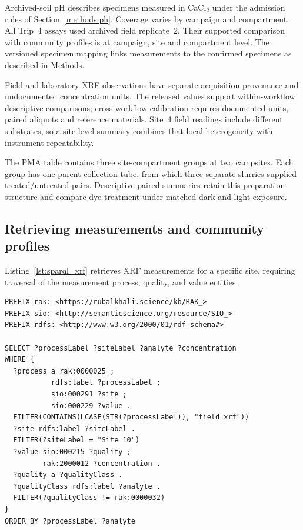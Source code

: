 \begin{revision}
Archived-soil pH describes specimens measured in CaCl$_2$ under the
admission rules of Section~\ref{methods:ph}. Coverage varies by
campaign and compartment. All Trip~4 assays used archived field
replicate~2. Their supported comparison with community profiles is at
campaign, site and compartment level. The versioned specimen mapping
links measurements to the confirmed specimens as described in Methods.

Field and laboratory XRF observations have separate acquisition
provenance and undocumented concentration units. The released values
support within-workflow descriptive comparisons; cross-workflow
calibration requires documented units, paired aliquots and reference
materials. Site~4 field readings include different substrates, so a
site-level summary combines that local heterogeneity with instrument
repeatability.

The PMA table contains three site-compartment groups at two campsites.
Each group has one parent collection tube, from which three separate
slurries supplied treated/untreated pairs. Descriptive paired summaries
retain this preparation structure and compare dye treatment under
matched dark and light exposure.




\subsection{Retrieving measurements and community profiles}
Listing~\ref{lst:sparql_xrf} retrieves XRF measurements for a specific site, requiring traversal of
the measurement process, quality, and value entities.

\begin{lstlisting}[caption={SPARQL query to retrieve field XRF
    measurements for Site 10. The query starts from the field-XRF
    measuring processes whose target is the site and walks to the
    individual analyte concentrations.},
  label={lst:sparql_xrf}, basicstyle=\ttfamily\scriptsize,
  frame=single]
PREFIX rak: <https://rubalkhali.science/kb/RAK_>
PREFIX sio: <http://semanticscience.org/resource/SIO_>
PREFIX rdfs: <http://www.w3.org/2000/01/rdf-schema#>

SELECT ?processLabel ?siteLabel ?analyte ?concentration
WHERE {
  ?process a rak:0000025 ;
           rdfs:label ?processLabel ;
           sio:000291 ?site ;
           sio:000229 ?value .
  FILTER(CONTAINS(LCASE(STR(?processLabel)), "field xrf"))
  ?site rdfs:label ?siteLabel .
  FILTER(?siteLabel = "Site 10")
  ?value sio:000215 ?quality ;
         rak:2000012 ?concentration .
  ?quality a ?qualityClass .
  ?qualityClass rdfs:label ?analyte .
  FILTER(?qualityClass != rak:0000032)
}
ORDER BY ?processLabel ?analyte
\end{lstlisting}


\end{revision}
